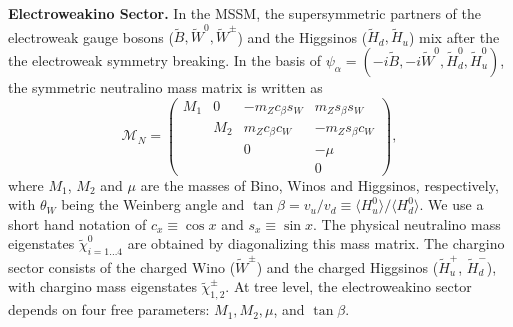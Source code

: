 \documentclass[
    prl,
    twocolumn,
    superscriptaddress,
    nofootinbib,
    amsmath, amssymb,
    aps,
    reprint,
    floatfix
]{revtex4-2}
\begin{document}


\vspace{0.1em}\noindent
\textbf{Electroweakino Sector.}
\label{sec:model}
% 
In the MSSM, the supersymmetric partners of the electroweak gauge bosons ($\tilde{B}, \tilde{W}^0, \tilde{W}^\pm$) and the Higgsinos ($\tilde{H}_d, \tilde{H}_u$) mix after the the electroweak symmetry breaking.  In the basis of $\psi_\alpha = (-i\tilde{B}, -i\tilde{W}^0, \tilde{H}_d^0, \tilde{H}_u^0)$, the symmetric neutralino mass matrix is written as  
\begin{equation}
\label{eq:massmatrix0}
\mathcal{M}_N =
	\begin{pmatrix}
	M_1 & 0 & -m_Z c_{\beta} s_{W} & m_Z s_{\beta} s_{W} \\
	& M_2 & m_Z c_{\beta} c_{W} & -m_Z s_{\beta} c_{W} \\
	 &  & 0 & -\mu \\
	 & & & 0
	\end{pmatrix}, 
\end{equation}
where $M_1$, $M_2$ and $\mu$ are the masses of Bino, Winos and Higgsinos, respectively, with $\theta_W$ being the Weinberg angle and $\tan\beta = v_u / v_d \equiv \langle {H}_u^0\rangle/\langle {H}_d^0\rangle$.  We use a short hand notation of $c_x\equiv\cos x$ and $s_x\equiv\sin x$. The physical neutralino mass eigenstates $\tilde{\chi}_{i=1\ldots 4}^0$ are obtained by diagonalizing this mass matrix. 
% 
The chargino sector consists of the charged Wino ($\tilde{W}^\pm$) and the charged Higgsinos ($\tilde{H}_u^+$, $\tilde{H}_d^-$), with chargino mass eigenstates $\tilde{\chi}_{1,2}^\pm$. At tree level, the electroweakino sector depends on four free  parameters: $M_1, M_2,  \mu$, and $\tan{\beta}$. 
\end{document}
